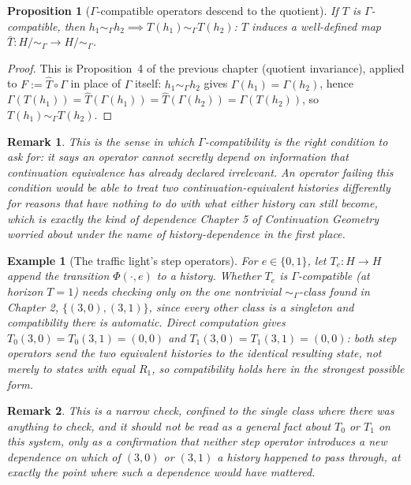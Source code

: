 \documentclass[11pt]{report}
\newtheorem{proposition}{Proposition}[chapter]
\newtheorem{remark}{Remark}[chapter]
\newtheorem{example}{Example}[chapter]
\begin{document}
\begin{proposition}[$\Gamma$-compatible operators descend to the quotient]
\label{prop:descend}
If $T$ is $\Gamma$-compatible, then $h_1 \sim_\Gamma h_2 \implies
T(h_1) \sim_\Gamma T(h_2)$: $T$ induces a well-defined map
$\bar{T} : H/{\sim_\Gamma} \to H/{\sim_\Gamma}$.
\end{proposition}
\begin{proof}
This is Proposition~4 of the previous chapter (quotient invariance),
applied to $F := \hat{T} \circ \Gamma$ in place of $\Gamma$ itself:
$h_1 \sim_\Gamma h_2$ gives $\Gamma(h_1) = \Gamma(h_2)$, hence
$\Gamma(T(h_1)) = \hat{T}(\Gamma(h_1)) = \hat{T}(\Gamma(h_2)) =
\Gamma(T(h_2))$, so $T(h_1) \sim_\Gamma T(h_2)$.
\end{proof}

\begin{remark}
This is the sense in which $\Gamma$-compatibility is the right
condition to ask for: it says an operator cannot secretly depend on
information that continuation equivalence has already declared
irrelevant. An operator failing this condition would be able to treat
two continuation-equivalent histories differently for reasons that
have nothing to do with what either history can still become, which
is exactly the kind of dependence Chapter 5 of \emph{Continuation
Geometry} worried about under the name of history-dependence in the
first place.
\end{remark}

\begin{example}[The traffic light's step operators]
For $e \in \{0,1\}$, let $T_e : H \to H$ append the transition
$\Phi(\cdot, e)$ to a history. Whether $T_e$ is $\Gamma$-compatible
(at horizon $T=1$) needs checking only on the one nontrivial
$\sim_\Gamma$-class found in Chapter 2, $\{(3,0),(3,1)\}$, since every
other class is a singleton and compatibility there is automatic.
Direct computation gives $T_0(3,0) = T_0(3,1) = (0,0)$ and
$T_1(3,0) = T_1(3,1) = (0,0)$: both step operators send the two
equivalent histories to the identical resulting state, not merely to
states with equal $R_1$, so compatibility holds here in the strongest
possible form.
\end{example}

\begin{remark}
This is a narrow check, confined to the single class where there was
anything to check, and it should not be read as a general fact about
$T_0$ or $T_1$ on this system, only as a confirmation that neither
step operator introduces a new dependence on which of $(3,0)$ or
$(3,1)$ a history happened to pass through, at exactly the point
where such a dependence would have mattered.
\end{remark}
\end{document}
